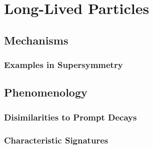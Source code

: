 \chapter{Long-Lived Particles}

\label{ch:longlived}

\section{Mechanisms}

\subsection{Examples in Supersymmetry}


\section{Phenomenology}

\subsection{Disimilarities to Prompt Decays}

\subsection{Characteristic Signatures}

